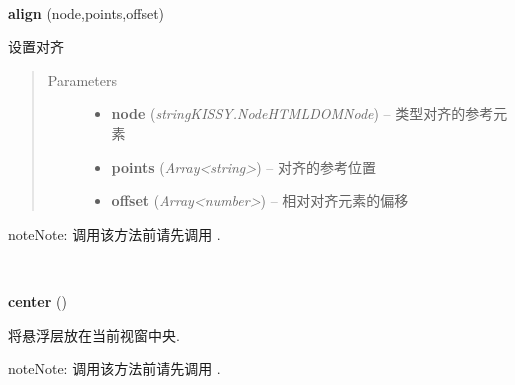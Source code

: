 \documentclass[letterpaper,10pt,english]{sphinxmanual}
\begin{document}
\begin{fulllineitems}
~
\begin{DUlineblock}{0em}
\item[] \textbf{align} (node,points,offset)
\item[] 设置对齐
\end{DUlineblock}
\begin{quote}\begin{description}
\item[{Parameters}] \leavevmode\begin{itemize}
\item {}
\textbf{node} (\emph{string\textbar{}KISSY.Node\textbar{}HTMLDOMNode}) -- 类型对齐的参考元素

\item {}
\textbf{points} (\emph{Array\textless{}string\textgreater{}}) -- 对齐的参考位置

\item {}
\textbf{offset} (\emph{Array\textless{}number\textgreater{}}) -- 相对对齐元素的偏移

\end{itemize}

\end{description}\end{quote}

\begin{notice}{note}{Note:}
调用该方法前请先调用 {\hyperref[api/component/overlay/overlay:Overlay.render]{}}.
\end{notice}

\end{fulllineitems}



\begin{fulllineitems}
\label{api/component/overlay/overlay:Overlay.center}~
\begin{DUlineblock}{0em}
\item[] \textbf{center} ()
\item[] 将悬浮层放在当前视窗中央.
\end{DUlineblock}

\begin{notice}{note}{Note:}
调用该方法前请先调用 {\hyperref[api/component/overlay/overlay:Overlay.render]{}}.
\end{notice}

\end{fulllineitems}
\end{document}
